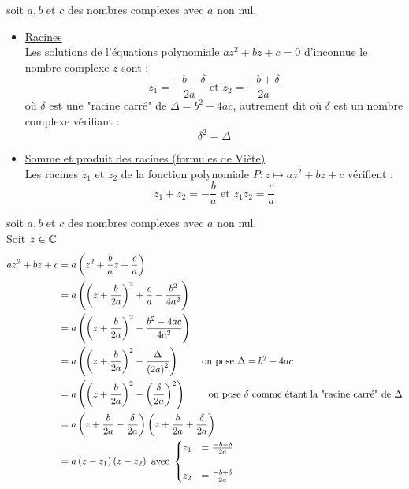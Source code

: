 \begin{defprop}
    soit \(a,b\) et \(c\) des nombres complexes avec \(a\) non nul. \\
    \begin{itemize}
        \item \underline{Racines} \\Les solutions de l'équations polynomiale \(az^2+bz+c=0\) d'inconnue le nombre complexe \(z\) sont : 
        \[z_1 = \frac{-b-\delta}{2a} \text{ et } z_2 = \frac{-b+\delta}{2a}\]
        où \(\delta\) est une "racine carré" de \(\Delta = b^2 -4ac\), autrement dit où \(\delta\) est un nombre complexe vérifiant : 
        \[\delta^2 = \Delta\]
        \item \underline{Somme et produit des racines (formules de Viète)} \\
        Les racines \(z_1\) et \(z_2\) de la fonction polynomiale \(P:z\mapsto az^2 + bz +c \) vérifient :
        \[z_1+z_2 = -\frac{b}{a} \text{ et } z_1z_2 = \frac{c}{a}\]

    \end{itemize}
\end{defprop}

\begin{dem}
    soit \(a,b\) et \(c\) des nombres complexes avec \(a\) non nul. \\
    Soit \(z \in \mathbb{C}\)
    \begin{align*}
        az^2+bz+c &= a\left(z^2+\frac{b}{a}z+\frac{c}{a}\right) \\
        &=a\left(\left(z+\frac{b}{2a}\right)^2+\frac{c}{a} - \frac{b^2}{4a^2}\right) \\
        &=a\left(\left(z+\frac{b}{2a}\right)^2 - \frac{b^2-4ac}{4a^2}\right) \\
        &=a\left(\left(z+\frac{b}{2a}\right)^2 - \frac{\Delta}{\left(2a\right)^2}\right)  \tag*{ on pose \(\Delta = b^2-4ac\)}\\
        &=a\left(\left(z+\frac{b}{2a}\right)^2 - \left(\frac{\delta}{2a}\right)^2\right) \tag*{ on pose \(\delta\)  comme étant la "racine carré" de \(\Delta\)}\\
        &=a\left(z+\frac{b}{2a}-\frac{\delta}{2a}\right)\left(z+\frac{b}{2a}+\frac{\delta}{2a}\right) \\
        &=a\left(z-z_1\right)\left(z-z_2\right) \text{ avec } 
        \begin{cases}
            z_1 &= \frac{-b-\delta}{2a} \\\\
            z_2 &= \frac{-b+\delta}{2a}
        \end{cases}
    \end{align*}
\end{dem}

